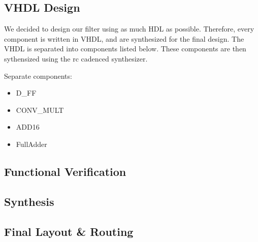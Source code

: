 \subsection{VHDL Design}
We decided to design our filter using as much HDL as possible.  Therefore, every component is written in VHDL, and are synthesized for the final design. The VHDL is separated into components listed below.  These components are then sythensized using the rc cadenced synthesizer. 

Separate components:
\begin{itemize}
\item D\_FF
\item CONV\_MULT
\item ADD16
\item FullAdder
\end{itemize}

\subsection{Functional Verification}



\subsection{Synthesis}



\subsection{Final Layout \& Routing}
